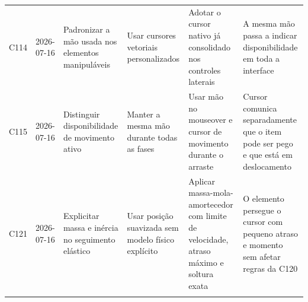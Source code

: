 \begin{landscape}
\begin{longtable}{p{1.0cm}p{1.9cm}p{4.0cm}p{5.0cm}p{6.2cm}p{5.7cm}}
\addlinespace[2pt]
C114 & 2026-07-16 & Padronizar a mão usada nos elementos manipuláveis & Usar cursores vetoriais personalizados & Adotar o cursor nativo já consolidado nos controles laterais & A mesma mão passa a indicar disponibilidade em toda a interface \\
\addlinespace[2pt]
C115 & 2026-07-16 & Distinguir disponibilidade de movimento ativo & Manter a mesma mão durante todas as fases & Usar mão no mouseover e cursor de movimento durante o arraste & Cursor comunica separadamente que o item pode ser pego e que está em deslocamento \\
\addlinespace[2pt]
C121 & 2026-07-16 & Explicitar massa e inércia no seguimento elástico & Usar posição suavizada sem modelo físico explícito & Aplicar massa-mola-amortecedor com limite de velocidade, atraso máximo e soltura exata & O elemento persegue o cursor com pequeno atraso e momento sem afetar regras da C120 \\
\addlinespace[2pt]
\bottomrule
\end{longtable}
\endgroup
\end{landscape}